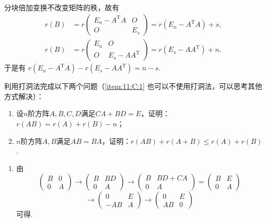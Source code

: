 \begin{exercise}
\begin{exgroup}
\begin{answer}
\begin{gather*}
            \end{gather*}
            分块倍加变换不改变矩阵的秩，故有
            \begin{align*}
                r(B) &= r\begin{pmatrix}
                    E_n - A^\mathrm{T}A & O   \\
                    O                   & E_s
                \end{pmatrix} = r(E_n - A^\mathrm{T}A) + s, \\
                r(B) &= r\begin{pmatrix}
                    E_n & O                   \\
                    O   & E_s - AA^\mathrm{T}
                \end{pmatrix} = r(E_s - AA^\mathrm{T}) + n.
            \end{align*}
            于是有 $r(E_n-A^\mathrm{T}A)-r(E_s-AA^\mathrm{T})=n-s$.
        \end{answer}

        \item 利用打洞法完成以下两个问题（\ref*{item:11:C:1} 也可以不使用打洞法，可以思考其他方式解决）：
        \begin{enumerate}
            \item 设$n$阶方阵$A,B,C,D$满足$CA+BD=E$，证明：$r(AB) = r(A)+r(B)-n$；

            \item \label{item:11:C:1}
                  $n$阶方阵$A,B$满足$AB=BA$，证明：$r(AB)+r(A+B)\leqslant r(A)+r(B)$.
        \end{enumerate}
        \begin{answer}
            \begin{enumerate}
                \item 由 \[\begin{pmatrix}B & 0 \\ 0 & A\end{pmatrix}\rightarrow \begin{pmatrix}B & BD \\ 0 & A\end{pmatrix}\rightarrow \begin{pmatrix}B & BD+CA \\ 0 & A\end{pmatrix}=\begin{pmatrix}B & E \\ 0 & A\end{pmatrix}\]
                      \[\rightarrow \begin{pmatrix}0 & E \\ -AB & A\end{pmatrix}\rightarrow \begin{pmatrix}0 & E \\ AB & 0\end{pmatrix}\]
                      可得.


\end{enumerate}
\end{answer}
\end{exgroup}
\end{exercise}
